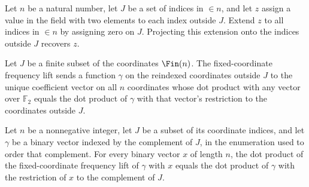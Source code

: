 \begin{theorem}
\label{FABL.fixedCoordinateProjectionLinear_fixedCoordinateExtension}
\leanok
{}
Let $n$ be a natural number, let $J$ be a set of indices in $\in n$, and let $z$ assign
a value in the field with two elements to each index outside $J$. Extend $z$ to all
indices in $\in n$ by assigning zero on $J$. Projecting this extension onto the indices
outside $J$ recovers $z$.
\end{theorem}

\begin{definition}
\label{FABL.fixedCoordinateFrequencyLift}
\leanok
{}
Let $J$ be a finite subset of the coordinates $\Fin(n)$. The fixed-coordinate frequency
lift sends a function $\gamma$ on the reindexed coordinates outside $J$ to the unique
coefficient vector on all $n$ coordinates whose dot product with any vector over
$\mathbb{F}_2$ equals the dot product of $\gamma$ with that vector's restriction to the
coordinates outside $J$.
\end{definition}

\begin{theorem}
\leanok
{}
Let $n$ be a nonnegative integer, let $J$ be a subset of its coordinate indices, and let
$\gamma$ be a binary vector indexed by the complement of $J$, in the enumeration used to
order that complement. For every binary vector $x$ of length $n$, the dot product of the
fixed-coordinate frequency lift of $\gamma$ with $x$ equals the dot product of $\gamma$
with the restriction of $x$ to the complement of $J$.
\end{theorem}


